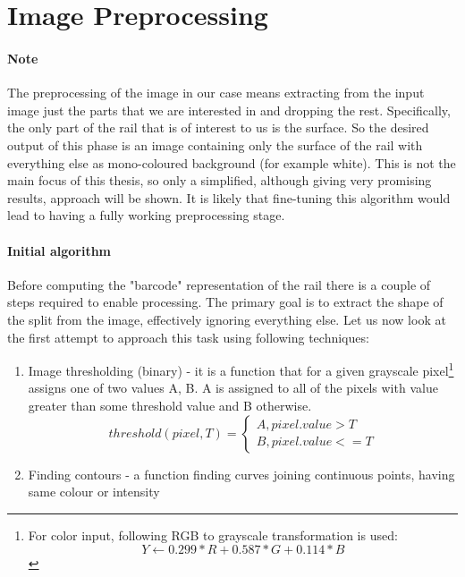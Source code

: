 \section{Image Preprocessing}
\paragraph{Note}
The preprocessing of the image in our case means extracting from the input image just the parts that we are interested in and dropping the rest. Specifically, the only part of the rail that is of interest to us is the surface. So the desired output of this phase is an image containing only the surface of the rail with everything else as mono-coloured background (for example white). This is not the main focus of this thesis, so only a simplified, although giving very promising results, approach will be shown. It is likely that fine-tuning this algorithm would lead to having a fully working preprocessing stage.

\paragraph{Initial algorithm}
Before computing the "barcode" representation of the rail there is a couple of steps required to enable processing. The primary goal is to extract the shape of the split from the image, effectively ignoring everything else. Let us now look at the first attempt to approach this task using following techniques:

\begin{enumerate}
	\item Image thresholding (binary) - it is a function that for a given grayscale pixel\footnote{For color input, following RGB to grayscale transformation is used: \begin{equation*}Y \gets 0.299 * R + 0.587 * G + 0.114 * B\end{equation*}} assigns one of two values {A, B}. A is assigned to all of the pixels with value greater than some threshold value and B otherwise.
	$$
	threshold (pixel, T) = \begin{cases}
		A, pixel.value > T \\
		B, pixel.value <= T
	\end{cases}
	$$
	\item Finding contours - a function finding curves joining continuous points, having same colour or intensity
\end{enumerate}

